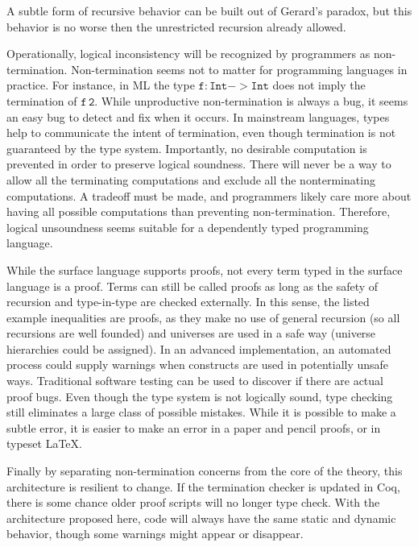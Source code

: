 A subtle form of recursive behavior can be built out of Gerard's paradox\cite{Reinhold89typecheckingis}, but this behavior is no worse then the unrestricted recursion already allowed.



Operationally, logical inconsistency will be recognized by programmers as non-termination.
Non-termination seems not to matter for programming languages in practice.
For instance, in ML the type $\mathtt{f:Int->Int}$ does not imply the termination of $\mathtt{f\,2}$.
While unproductive non-termination is always a bug, it seems an easy bug to detect and fix when it occurs.
In mainstream languages, types help to communicate the intent of termination, even though termination is not guaranteed by the type system.
Importantly, no desirable computation is prevented in order to preserve logical soundness.
There will never be a way to allow all the terminating computations and exclude all the nonterminating computations.
A tradeoff must be made, and programmers likely care more about having all possible computations than preventing non-termination.
Therefore, logical unsoundness seems suitable for a dependently typed programming language.



While the surface language supports proofs, not every term typed in the surface language is a proof.
Terms can still be called proofs as long as the safety of recursion and type-in-type are checked externally.
In this sense, the listed example inequalities are proofs, as they make no use of general recursion (so all recursions are well founded) and universes are used in a safe way (universe hierarchies could be assigned).
In an advanced implementation, an automated process could supply warnings when constructs are used in potentially unsafe ways.
Traditional software testing can be used to discover if there are actual proof bugs.
Even though the type system is not logically sound, type checking still eliminates a large class of possible mistakes.
While it is possible to make a subtle error, it is easier to make an error in a paper and pencil proofs, or in typeset \LaTeX .

Finally by separating non-termination concerns from the core of the theory, this architecture is resilient to change.
If the termination checker is updated in Coq, there is some chance older proof scripts will no longer type check.
With the architecture proposed here, code will always have the same static and dynamic behavior, though some warnings might appear or disappear.

